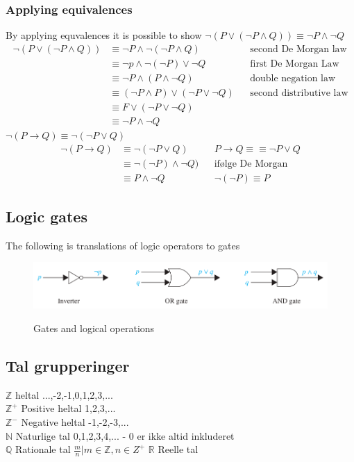 \documentclass[12pt, a4paper]{article}
\begin{document}
					\subsubsection{Applying equivalences}
					By applying equvalences it is possible to show $\neg(P\lor (\neg P \land Q))\equiv \neg P \land \neg Q$\\
					\begin{align*}
						\neg(P\lor(\neg P \land Q))&\equiv \neg P\land\neg(\neg P\land Q) && \text{second De Morgan law}\\
									   &\equiv \neg p \land \neg (\neg P)\lor \neg Q && \text{first De Morgan Law}\\
									   &\equiv \neg P \land (P \land \neg Q) && \text{double negation law}\\
									   &\equiv (\neg P \land P)\lor(\neg P \lor \neg Q) && \text{second distributive law}\\
									   &\equiv F \lor (\neg P \lor \neg Q) \\
									   &\equiv \neg P \land \neg Q
					\end{align*}
					$\neg(P\rightarrow Q)\equiv \neg (\neg P\lor Q)$
					\begin{align*}
						\neg(P\rightarrow Q) &\equiv \neg (\neg P \lor Q) && P\rightarrow Q\equiv \equiv \neg P \lor Q\\
								  &\equiv\neg (\neg P) \land \neg Q) && \text{ifølge De Morgan}\\
								  &\equiv P \land \neg Q &&\neg(\neg P) \equiv P
					\end{align*}
			\subsection{Logic gates}
				The following is translations of logic operators to gates\\
				\begin{figure}[h]
					\includegraphics[width=\linewidth]{assets/gates.png}
					\label{gates}
					\caption{Gates and logical operations}
					\end{figure}
			
			\subsection{Tal grupperinger}
				$\mathbb{Z}$ heltal {...,-2,-1,0,1,2,3,...}\\
				$\mathbb{Z}^+$ Positive heltal {1,2,3,...}\\
				$\mathbb{Z}^-$ Negative heltal {-1,-2,-3,...}\\
				$\mathbb{N}$ Naturlige tal {0,1,2,3,4,...} - 0 er ikke altid inkluderet\\
				$\mathbb{Q}$ Rationale tal {$\frac{m}{n}|m\in \mathbb{Z} , n \in Z^+$}
				$\mathbb{R}$ Reelle tal
\end{document}
